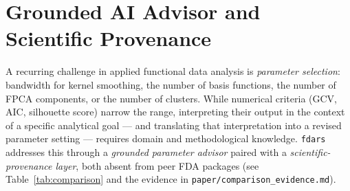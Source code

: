 
\section{Grounded AI Advisor and Scientific Provenance}
\label{sec:advisor}

A recurring challenge in applied functional data analysis is \emph{parameter
selection}: bandwidth for kernel smoothing, the number of basis functions, the
number of FPCA components, or the number of clusters.  While numerical
criteria (GCV, AIC, silhouette score) narrow the range, interpreting their
output in the context of a specific analytical goal --- and translating that
interpretation into a revised parameter setting --- requires domain and
methodological knowledge.  \texttt{fdars} addresses this through a
\emph{grounded parameter advisor} paired with a \emph{scientific-provenance
layer}, both absent from peer FDA packages (see Table~\ref{tab:comparison} and
the evidence in \texttt{paper/comparison\_evidence.md}).

